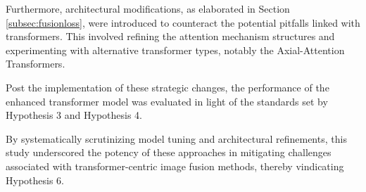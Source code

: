 Furthermore, architectural modifications, as elaborated in Section \ref{subsec:fusionloss}, were introduced to counteract the potential pitfalls linked with transformers. This involved refining the attention mechanism structures and experimenting with alternative transformer types, notably the Axial-Attention Transformers.

Post the implementation of these strategic changes, the performance of the enhanced transformer model was evaluated in light of the standards set by Hypothesis 3 and Hypothesis 4.

By systematically scrutinizing model tuning and architectural refinements, this study underscored the potency of these approaches in mitigating challenges associated with transformer-centric image fusion methods, thereby vindicating Hypothesis 6.
